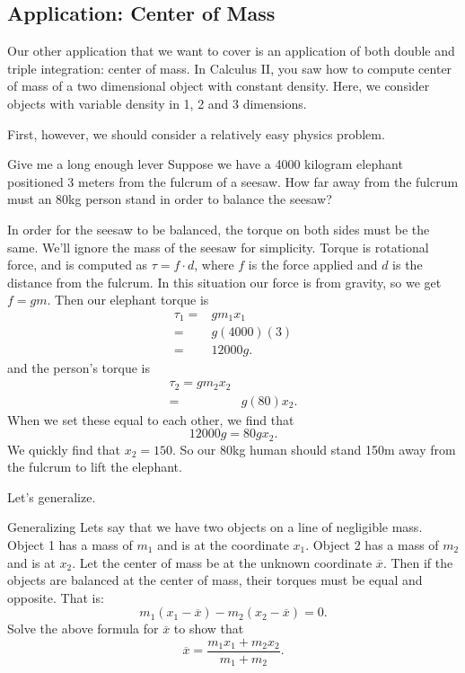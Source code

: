 \subsection{Application: Center of Mass}

Our other application that we want to cover is an application of both double and triple integration: center of mass. In Calculus II, you saw how to compute center of mass of a two dimensional object with constant density. Here, we consider objects with variable density in 1, 2 and 3 dimensions.

First, however, we should consider a relatively easy physics problem. 

\begin{example}{Give me a long enough lever}
Suppose we have a 4000 kilogram elephant positioned 3 meters from the fulcrum of a seesaw. How far away from the fulcrum must an 80kg person stand in order to balance the seesaw?

In order for the seesaw to be balanced, the torque on both sides must be the same. We'll ignore the mass of the seesaw for simplicity. Torque is rotational force, and is computed as $\tau=f\cdot d$, where $f$ is the force applied and $d$ is the distance from the fulcrum. In this situation our force is from gravity, so we get $f=gm$. Then our elephant torque is \begin{align*}\tau_1=&gm_1 x_1\\=&g(4000)(3)\\=&12000g.\end{align*} and the person's torque is \begin{align*}\tau_2=gm_2x_2\\=&g(80)x_2.\end{align*}
When we set these equal to each other, we find that $$12000g=80gx_2.$$ We quickly find that $x_2=150$. So our 80kg human should stand 150m away from the fulcrum to lift the elephant.
\end{example}

Let's generalize.

\begin{exercise}{Generalizing}
Lets say that we have two objects on a line of negligible mass. Object 1 has a mass of $m_1$ and is at the coordinate $x_1$. Object 2 has a mass of $m_2$ and is at $x_2$. Let the center of mass be at the unknown coordinate $\overline{x}$. Then if the objects are balanced at the center of mass, their torques must be equal and opposite. That is: $$m_1(x_1-\overline{x})-m_2(x_2-\overline{x})=0. $$
Solve the above formula for $\overline{x}$ to show that $$\overline{x}=\frac{m_1x_1+m_2x_2}{m_1+m_2}.$$
\end{exercise}

